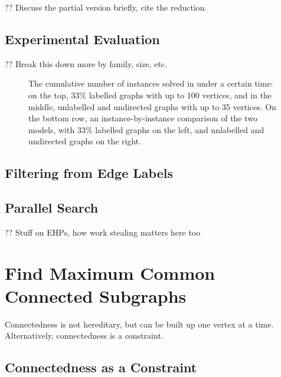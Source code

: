 \documentclass{llncs}
\begin{document}
?? Discuss the partial version briefly, cite the reduction.

\subsection{Experimental Evaluation}

?? Break this down more by family, size, etc.

\begin{figure}[p]
    \centering
    
    \vspace*{1em}

    \centering
    
    \caption{The cumulative number of instances solved in under a certain time: on the top, 33\%
        labelled graphs with up to 100 vertices, and in the middle, unlabelled and undirected graphs
        with up to 35 vertices. On the bottom row, an instance-by-instance comparison of the two
        models, with 33\% labelled graphs on the left, and unlabelled and undirected graphs on
        the right.} \label{figure:unconnected-cumulative}
\end{figure}

\subsection{Filtering from Edge Labels}

\subsection{Parallel Search}

\cite{DBLP:journals/jcc/KoncDTRJ12,DBLP:journals/algorithms/McCreeshP13,DBLP:journals/topc/McCreeshP15,DBLP:journals/cor/SegundoLP16}

?? Stuff on EHPs, how work stealing matters here too \cite{DBLP:journals/jco/BatsynGMP14}

\section{Find Maximum Common Connected Subgraphs}

Connectedness is not hereditary, but can be built up one vertex at a time. Alternatively,
connectedness is a constraint.

\subsection{Connectedness as a Constraint}
\end{document}
